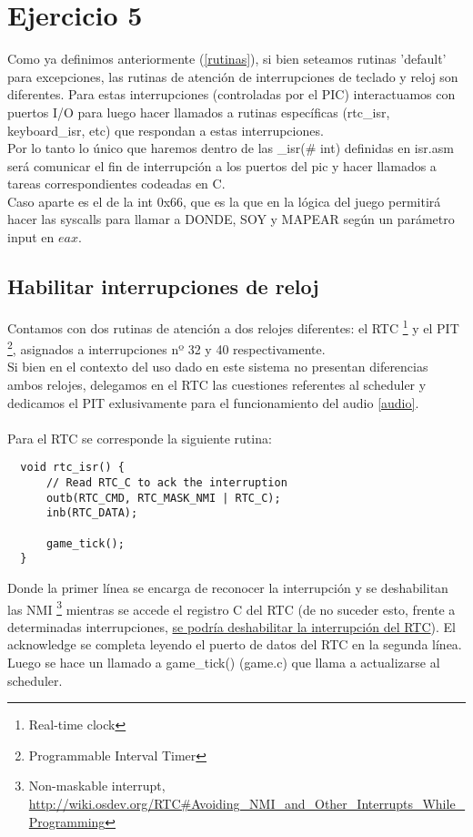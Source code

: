 \section{Ejercicio 5}
Como ya definimos anteriormente (\ref{rutinas}), si bien seteamos rutinas 'default' para excepciones, las rutinas de atención de interrupciones de teclado y reloj son diferentes.
Para estas interrupciones (controladas por el PIC) interactuamos con puertos I/O para luego hacer llamados a rutinas específicas (rtc_isr, keyboard_isr, etc) que respondan a estas interrupciones.
\\Por lo tanto lo único que haremos dentro de las _isr(\# int) definidas en isr.asm será comunicar el fin de interrupción a los puertos del pic y hacer llamados a tareas correspondientes codeadas en C.
\\Caso aparte es el de la int 0x66, que es la que en la lógica del juego permitirá hacer las syscalls para llamar a DONDE, SOY y MAPEAR según un parámetro input en $eax$.

\subsection{Habilitar interrupciones de reloj}
Contamos con dos rutinas de atención a dos relojes diferentes: el RTC \footnote{Real-time clock } y el PIT \footnote{Programmable Interval Timer}, asignados a interrupciones nº 32 y 40 respectivamente. \\
Si bien en el contexto del uso dado en este sistema no presentan diferencias ambos relojes, delegamos en el RTC las cuestiones referentes al scheduler y dedicamos el PIT exlusivamente para el funcionamiento del audio \ref{audio}.
\\
\\
Para el RTC se corresponde la siguiente rutina:

\begin{lstlisting}
  void rtc_isr() {
      // Read RTC_C to ack the interruption
      outb(RTC_CMD, RTC_MASK_NMI | RTC_C);
      inb(RTC_DATA);

      game_tick();
  }
\end{lstlisting}

Donde la primer línea se encarga de reconocer la interrupción y se deshabilitan las NMI
\footnote{Non-maskable interrupt, \url{http://wiki.osdev.org/RTC\#Avoiding_NMI_and_Other_Interrupts_While_Programming}} mientras se accede el registro C del RTC (de no suceder esto, frente a determinadas interrupciones,
\href{http://wiki.osdev.org/RTC\#Interrupts_and_Register_C}{se podría deshabilitar la interrupción del RTC}). El acknowledge se completa leyendo el puerto de datos del RTC en la segunda línea. \\
Luego se hace un llamado a game_tick() (game.c) que llama a actualizarse al scheduler.



